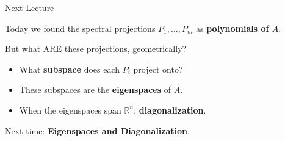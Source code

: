 \documentclass[10pt]{beamer}
\theoremstyle{definition}
\newcommand{\x}[1]{\alert{\textbf{#1}}}
\begin{document}
\begin{frame}{Next Lecture}

\vfill

Today we found the spectral projections $P_1, \ldots, P_m$ as \x{polynomials of $A$}.

\vfill

But what ARE these projections, geometrically?

\vfill\pause

\begin{itemize}
\item What \x{subspace} does each $P_i$ project onto?

\vfill

\item These subspaces are the \x{eigenspaces} of $A$.

\vfill

\item When the eigenspaces span $\mathbb{R}^n$: \x{diagonalization}.
\end{itemize}

\vfill

\begin{center}
{\Large Next time: \x{Eigenspaces and Diagonalization}.}
\end{center}

\vfill

\end{frame}
\end{document}
